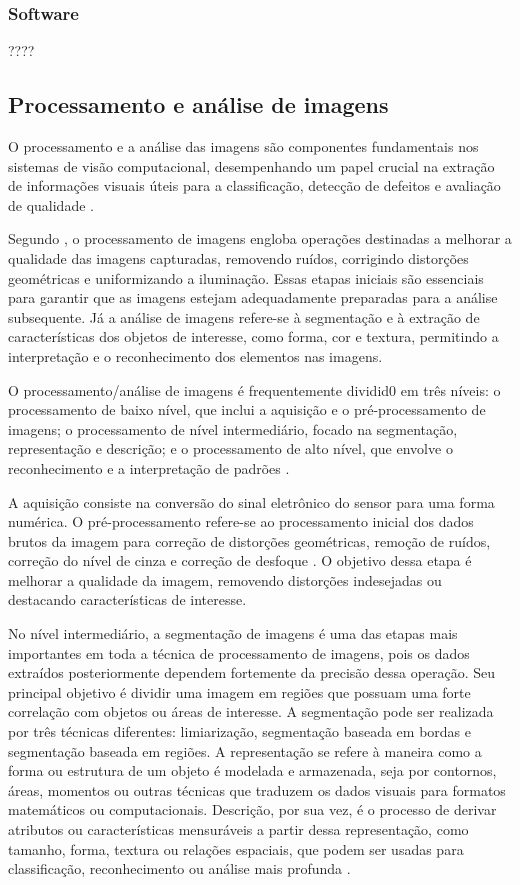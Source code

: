 \subsubsection{Software}

????

\subsection{Processamento e análise de imagens}

O processamento e a análise das imagens são componentes fundamentais nos sistemas de visão computacional, desempenhando um papel crucial na extração de informações visuais úteis para a classificação, detecção de defeitos e avaliação de qualidade \cite{krutz2000colour}. 

Segundo , o processamento de imagens engloba operações destinadas a melhorar a qualidade das imagens capturadas, removendo ruídos, corrigindo distorções geométricas e uniformizando a iluminação. Essas etapas iniciais são essenciais para garantir que as imagens estejam adequadamente preparadas para a análise subsequente. Já a análise de imagens refere-se à segmentação e à extração de características dos objetos de interesse, como forma, cor e textura, permitindo a interpretação e o reconhecimento dos elementos nas imagens.

O processamento/análise de imagens é frequentemente dividid0 em três níveis: o processamento de baixo nível, que inclui a aquisição e o pré-processamento de imagens; o processamento de nível intermediário, focado na segmentação, representação e descrição; e o processamento de alto nível, que envolve o reconhecimento e a interpretação de padrões \cite{gunasekaran1996computer, sun2000pizza}.

A aquisição consiste na conversão do sinal eletrônico do sensor para uma forma numérica. O pré-processamento refere-se ao processamento inicial dos dados brutos da imagem para correção de distorções geométricas, remoção de ruídos, correção do nível de cinza e correção de desfoque \cite{shirai1987}. O objetivo dessa etapa é melhorar a qualidade da imagem, removendo distorções indesejadas ou destacando características de interesse.

No nível intermediário, a segmentação de imagens é uma das etapas mais importantes em toda a técnica de processamento de imagens, pois os dados extraídos posteriormente dependem fortemente da precisão dessa operação. Seu principal objetivo é dividir uma imagem em regiões que possuam uma forte correlação com objetos ou áreas de interesse. A segmentação pode ser realizada por três técnicas diferentes: limiarização, segmentação baseada em bordas e segmentação baseada em regiões. A representação se refere à maneira como a forma ou estrutura de um objeto é modelada e armazenada, seja por contornos, áreas, momentos ou outras técnicas que traduzem os dados visuais para formatos matemáticos ou computacionais. Descrição, por sua vez, é o processo de derivar atributos ou características mensuráveis a partir dessa representação, como tamanho, forma, textura ou relações espaciais, que podem ser usadas para classificação, reconhecimento ou análise mais profunda \cite{sonka1993}.

